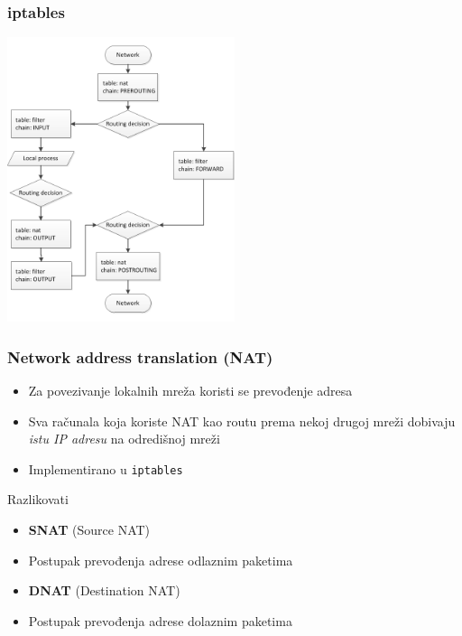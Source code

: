 \documentclass[t,table,usenames,dvipsnames]{beamer}
\begin{document}
\begin{frame}
	\frametitle{iptables}
	\centering
	\vspace{-1em}
	\includegraphics[width=0.5\textwidth]{iptables.png}
\end{frame}

\begin{frame}
	\frametitle{Network address translation (NAT)}
	\begin{itemize}
		\item Za povezivanje lokalnih mreža koristi se prevođenje adresa
		\item Sva računala koja koriste NAT kao routu prema nekoj drugoj mreži dobivaju \textit{istu IP adresu} na odredišnoj mreži
		\item Implementirano u \texttt{iptables}
	\end{itemize}
	\vfill
	Razlikovati
	\begin{itemize}
		\item \textbf{SNAT} (Source NAT)
		\item[] Postupak prevođenja adrese odlaznim paketima
		\item \textbf{DNAT} (Destination NAT)
		\item[] Postupak prevođenja adrese dolaznim paketima
	\end{itemize}
\end{frame}
\end{document}
